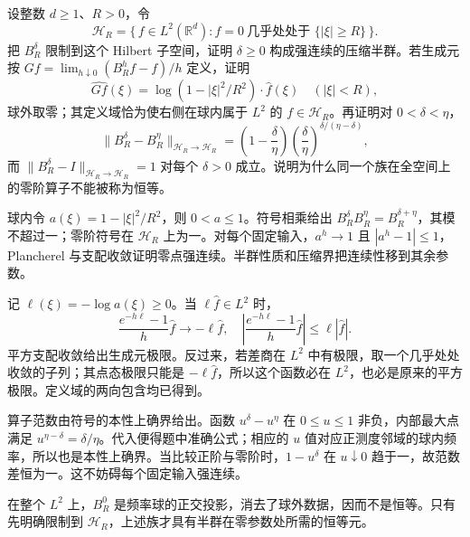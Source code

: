 \begin{exercise}\label{b2:ex:24-new-1}
设整数 \(d\geq1\)、\(R>0\)，令
\[
 \mathcal H_R=\{\,f\in L^2(\mathbb R^d):
          \widehat f=0\ \text{几乎处处于 }\{|\xi|\geq R\}\,\}.
\]
把 \(B_R^\delta\) 限制到这个 Hilbert 子空间，证明 \(\delta\geq0\) 构成强连续的压缩半群。若生成元按
\(Gf=\lim_{h\downarrow0}(B_R^hf-f)/h\) 定义，证明
\[
 \widehat{Gf}(\xi)=\log(1-|\xi|^2/R^2)\cdot\widehat f(\xi)
       \quad(|\xi|<R),
\]
球外取零；其定义域恰为使右侧在球内属于 \(L^2\) 的 \(f\in\mathcal H_R\)。再证明对 \(0<\delta<\eta\)，
\[
 \|B_R^\delta-B_R^\eta\|_{\mathcal H_R\to\mathcal H_R}
 =\left(1-\frac\delta\eta\right)
       \left(\frac\delta\eta\right)^{\delta/(\eta-\delta)},
\]
而 \(\|B_R^\delta-I\|_{\mathcal H_R\to\mathcal H_R}=1\) 对每个 \(\delta>0\) 成立。说明为什么同一个族在全空间上的零阶算子不能被称为恒等。
\end{exercise}
\begin{solution}
球内令 \(a(\xi)=1-|\xi|^2/R^2\)，则 \(0<a\leq1\)。符号相乘给出
\(B_R^\delta B_R^\eta=B_R^{\delta+\eta}\)，其模不超过一；零阶符号在 \(\mathcal H_R\) 上为一。对每个固定输入，\(a^h\to1\) 且 \(|a^h-1|\leq1\)，Plancherel 与支配收敛证明零点强连续。半群性质和压缩界把连续性移到其余参数。

记 \(\ell(\xi)=-\log a(\xi)\geq0\)。当 \(\ell\widehat f\in L^2\) 时，
\[
 \frac{e^{-h\ell}-1}{h}\widehat f\longrightarrow-\ell\widehat f,
 \quad
 \left|\frac{e^{-h\ell}-1}{h}\widehat f\right|
       \leq\ell|\widehat f|.
\]
平方支配收敛给出生成元极限。反过来，若差商在 \(L^2\) 中有极限，取一个几乎处处收敛的子列；其点态极限只能是 \(-\ell\widehat f\)，所以这个函数必在 \(L^2\)，也必是原来的平方极限。定义域的两向包含均已得到。

算子范数由符号的本性上确界给出。函数 \(u^\delta-u^\eta\) 在 \(0\leq u\leq1\) 非负，内部最大点满足
\(u^{\eta-\delta}=\delta/\eta\)。代入便得题中准确公式；相应的 \(u\) 值对应正测度邻域的球内频率，所以也是本性上确界。当比较正阶与零阶时，\(1-u^\delta\) 在 \(u\downarrow0\) 趋于一，故范数差恒为一。这不妨碍每个固定输入强连续。

在整个 \(L^2\) 上，\(B_R^0\) 是频率球的正交投影，消去了球外数据，因而不是恒等。只有先明确限制到 \(\mathcal H_R\)，上述族才具有半群在零参数处所需的恒等元。
\end{solution}

